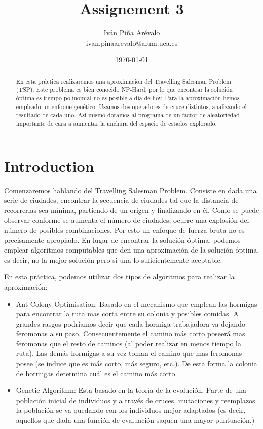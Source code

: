 \documentclass{article}
\title{Assignement 3}
\author{Iván Piña Arévalo \\ ivan.pinaarevalo@alum.uca.es}
\date{\today}
\begin{document}
\maketitle

\newpage
\begin{abstract}
    En esta práctica realizaremos una aproximación del Travelling Salesman Problem (TSP). Este problema es bien conocido 
    NP-Hard, por lo que encontrar la solución óptima es tiempo polinomial no es posible a día de hoy.  Para la aproximación hemos 
    empleado un enfoque genético. Usamos dos operadores de cruce distintos, analizando el resultado de cada uno. Así mismo 
    dotamos al programa de un factor de aleatoriedad importante de cara a aumentar la anchura del espacio de estados explorado. 
\end{abstract}

\newpage
\section{Introduction}
    Comenzaremos hablando del Travelling Salesman Problem. Consiste en dada una serie de ciudades, encontrar la secuencia de ciudades tal que la distancia de recorrerlas 
    sea mínima, partiendo de un origen y finalizando en él. Como se puede observar conforme se aumenta el número de ciudades, ocurre
    una explosión del número de posibles combinaciones. Por esto un enfoque de fuerza bruta no es precisamente apropiado. En lugar 
    de encontrar la solución óptima, podemos emplear algoritmos computables que den una aproximación de la solución óptima, es decir, 
    no la mejor solución pero si una lo suficientemente aceptable. 

    En esta práctica, podemos utilizar dos tipos de algoritmos para realizar la aproximación:
    \begin{itemize}
        \item Ant Colony Optimisation: Basado en el mecanismo que emplean las hormigas para encontrar la ruta mas corta 
        entre su colonia y posibles comidas. A grandes rasgos podríamos decir que cada hormiga trabajadora va dejando feromonas 
        a su paso. Consecuentemente el camino más corto poseerá mas feromonas que el resto de caminos (al poder realizar en menos 
        tiempo la ruta). Las demás hormigas a su vez toman el camino que mas feromonas posee (se induce que es más corto, más seguro, etc.).
        De esta forma la colonia de hormigas determina cuál es el camino más corto. 
        \item Genetic Algorithm: Esta basado en la teoría de la evolución. Parte de una población inicial de individuos y a través 
        de cruces, mutaciones y reemplazos la población se va quedando con los individuos mejor adaptados (es decir, aquellos que 
        dada una función de evaluación saquen una mayor puntuación.)
    \end{itemize}
\end{document}
